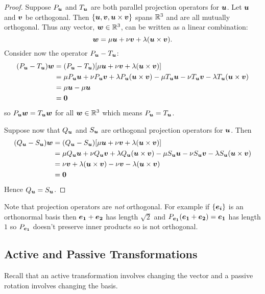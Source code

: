 \documentclass[a4paper]{article}
\begin{document}
    \begin{proof}
        Suppose \(P_{\bm{u}}\) and \(T_{\bm{u}}\) are both parallel projection operators for \(\bm{u}\).
        Let \(\bm{u}\) and \(\bm{v}\) be orthogonal.
        Then \(\{\bm{u}, \bm{v}, \bm{u}\times\bm{v}\}\) spans \(\mathbb{R}^3\) and are all mutually orthogonal.
        Thus any vector, \(\bm{w}\in\mathbb{R}^3\), can be written as a linear combination:
        \[\bm{w} = \mu\bm{u} + \nu\bm{v} + \lambda(\bm{u}\times\bm{v}).\]
        Consider now the operator \(P_{\bm{u}} - T_{\bm{u}}\):
        \begin{align*}
            (P_{\bm{u}} - T_{\bm{u}})\bm{w} &= (P_{\bm{u}} - T_{\bm{u}}) [\mu\bm{u} + \nu\bm{v} + \lambda(\bm{u}\times\bm{v})]\\
            &= \mu P_{\bm{u}}\bm{u} + \nu P_{\bm{u}}\bm{v} + \lambda P_{\bm{u}}(\bm{u}\times\bm{v}) - \mu T_{\bm{u}}\bm{u} - \nu T_{\bm{u}}\bm{v} - \lambda T_{\bm{u}}(\bm{u}\times\bm{v})\\
            &= \mu\bm{u} - \mu\bm{u}\\
            &= \bm{0}
        \end{align*}
        so \(P_{\bm{u}}\bm{w} = T_{\bm{u}}\bm{w}\) for all \(\bm{w}\in\mathbb{R}^3\) which means \(P_{\bm{u}} = T_{\bm{u}}\).
        
        Suppose now that \(Q_{\bm{u}}\) and \(S_{\bm{u}}\) are orthogonal projection operators for \(\bm{u}\).
        Then
        \begin{align*}
            (Q_{\bm{u}} - S_{\bm{u}})\bm{w} &= (Q_{\bm{u}} - S_{\bm{u}}) [\mu\bm{u} + \nu\bm{v} + \lambda(\bm{u}\times\bm{v})]\\
            &= \mu Q_{\bm{u}}\bm{u} + \nu Q_{\bm{u}}\bm{v} + \lambda Q_{\bm{u}}(\bm{u}\times\bm{v}) - \mu S_{\bm{u}}\bm{u} - \nu S_{\bm{u}}\bm{v} - \lambda S_{\bm{u}}(\bm{u}\times\bm{v})\\
            &= \nu\bm{v} + \lambda(\bm{u}\times\bm{v}) - \nu\bm{v} - \lambda(\bm{u}\times\bm{v})\\
            &= \bm{0}
        \end{align*}
        Hence \(Q_{\bm{u}} = S_{\bm{u}}\).
    \end{proof}
    Note that projection operators are \emph{not} orthogonal.
    For example if \(\{\bm{e_{i}}\}\) is an orthonormal basis then \(\bm{e_{1}} + \bm{e_{2}}\) has length \(\sqrt{2}\) and \(P_{\bm{e_{1}}}(\bm{e_{1}} + \bm{e_{2}}) = \bm{e_{1}}\) has length \(1\) so \(P_{\bm{e_{1}}}\) doesn't preserve inner products so is not orthogonal.
    
    \subsection{Active and Passive Transformations}
    Recall that an active transformation involves changing the vector and a passive rotation involves changing the basis.
    
\end{document}
